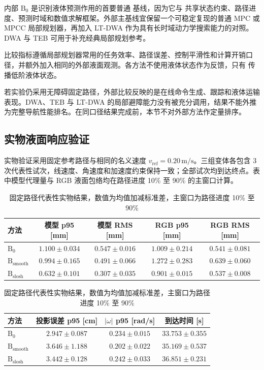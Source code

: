 内部 $\mathrm{B}_{0}$ 是识别液体预测作用的首要普通 \MPCC{} 基线，因为它与 \SPMPC{} 共享状态约束、路径进度、预测时域和数值求解框架。外部主基线宜保留一个可稳定复现的普通 MPC 或 MPCC 局部规划器，再加入 LT-DWA 作为具有长时域动力学搜索能力的对照\cite{D02_Jian2023}。DWA 与 TEB 可用于补充经典局部规划参考\cite{D15_Fox1997,D16_Rosmann2017}。

比较指标遵循局部规划器常用的任务效率、路径误差、控制平滑性和计算开销口径\cite{D21_Wen2021}，并额外加入相同的外部液面观测。各方法不使用液体状态作为反馈，只有 \SPMPC{} 传播低阶液体状态。

若实验仍采用无障碍固定路径，外部比较反映的是在线命令生成、跟踪和液体运输表现。DWA、TEB 与 LT-DWA 的局部避障能力没有被充分调用，结果不能外推为完整导航性能排名。在同口径结果完成前，本节不对外部方法作定量排序。

\subsection{实物液面响应验证}

实物验证采用固定参考路径与相同的名义速度 $v_{\mathrm{ref}}=0.20\,\mathrm{m/s}$。三组变体各包含 3 次代表性试次，线速度、角速度和加速度约束保持一致；全部试次均到达终点。表中模型代理量与 RGB 液面包络均在路径进度 10\% 至 90\% 的主窗口计算。

\begin{table}[!htbp]
  \centering
  \scriptsize
  \setlength{\tabcolsep}{2.5pt}
  \renewcommand{\arraystretch}{1.08}
  \caption{固定路径代表性实物结果，数值为均值加减标准差，主窗口为路径进度 10\% 至 90\%}
  \label{tab:real_fixed_path_ablation}
  \begin{tabular}{lcccc}
    \toprule
    方法 & 模型 p95 [mm] & 模型 RMS [mm] & RGB p95 [mm] & RGB RMS [mm] \\
    \midrule
    $\mathrm{B}_{0}$
      & $1.100\pm0.034$
      & $0.547\pm0.016$
      & $1.009\pm0.214$
      & $0.541\pm0.081$ \\
    $\mathrm{B}_{\mathrm{smooth}}$
      & $0.994\pm0.165$
      & $0.491\pm0.066$
      & $1.272\pm0.283$
      & $0.639\pm0.060$ \\
    $\mathrm{B}_{\mathrm{slosh}}$
      & $0.632\pm0.101$
      & $0.307\pm0.035$
      & $0.901\pm0.015$
      & $0.537\pm0.008$ \\
    \bottomrule
  \end{tabular}

  \vspace{0.45em}

  \begin{tabular}{lccc}
    \toprule
    方法 & 投影误差 p95 [cm] & $|\omega|$ p95 [rad/s] & 到达时间 [s] \\
    \midrule
    $\mathrm{B}_{0}$
      & $2.947\pm0.087$
      & $0.234\pm0.015$
      & $33.753\pm0.355$ \\
    $\mathrm{B}_{\mathrm{smooth}}$
      & $3.646\pm1.188$
      & $0.202\pm0.022$
      & $35.169\pm0.537$ \\
    $\mathrm{B}_{\mathrm{slosh}}$
      & $3.442\pm0.128$
      & $0.242\pm0.033$
      & $36.851\pm0.231$ \\
    \bottomrule
  \end{tabular}
\end{table}

